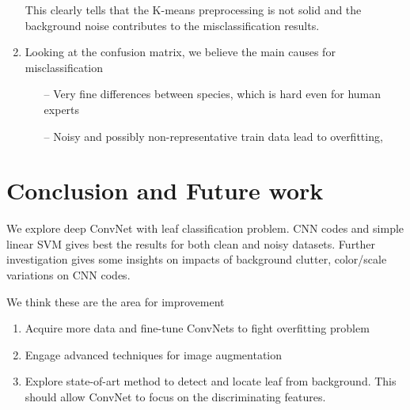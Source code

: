 \documentclass[journal, 10pt]{IEEEtran}
\begin{document}
\begin{enumerate}
This clearly tells that the K-means preprocessing is not solid and the background noise contributes to the misclassification results.


\item Looking at the confusion matrix, we believe the main causes for misclassification
      \begin{itemize}
        \item [--] Very fine differences between species, which is hard even for human experts
        \item [--] Noisy and possibly non-representative train data lead to overfitting,
      \end{itemize}
\end{enumerate}

\section{Conclusion and Future work}
We explore deep ConvNet with leaf classification problem. CNN codes and simple linear SVM gives best the results for both clean and noisy datasets. Further investigation gives some insights on impacts of background clutter, color/scale variations on CNN codes.

We think these are the area for improvement
  \begin{enumerate}
    \item Acquire more data and fine-tune ConvNets to fight overfitting problem
    \item Engage advanced techniques for image augmentation
    \item Explore state-of-art method to detect and locate leaf from background. This should allow ConvNet to focus on the discriminating features.
  \end{enumerate}



%
\end{document}

